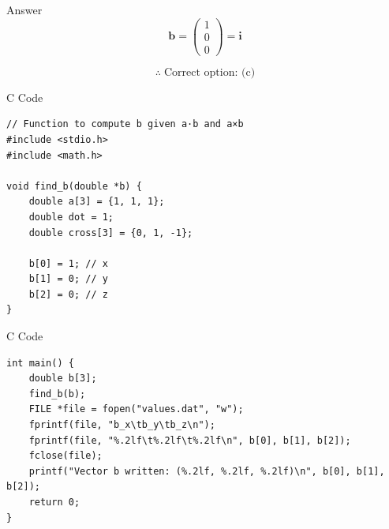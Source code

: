 \documentclass{beamer}
\newcommand{\myvec}[1]{\begin{pmatrix}#1\end{pmatrix}}
\renewcommand{\vec}[1]{\mathbf{#1}}
\begin{document}
\begin{frame}{Answer}
\[
\vec{b} = \myvec{1\\0\\0} = \vec{i}
\]

\[
\therefore \; \text{Correct option: (c)}
\]
\end{frame}

\begin{frame}[fragile]{C Code}
\lstset{language=C}
\begin{lstlisting}
// Function to compute b given a·b and a×b
#include <stdio.h>
#include <math.h>

void find_b(double *b) {
    double a[3] = {1, 1, 1};
    double dot = 1;
    double cross[3] = {0, 1, -1};

    b[0] = 1; // x
    b[1] = 0; // y
    b[2] = 0; // z
}
\end{lstlisting}
\end{frame}

\begin{frame}[fragile]{C Code}
\lstset{language=C}
\begin{lstlisting}
int main() {
    double b[3];
    find_b(b);
    FILE *file = fopen("values.dat", "w");
    fprintf(file, "b_x\tb_y\tb_z\n");
    fprintf(file, "%.2lf\t%.2lf\t%.2lf\n", b[0], b[1], b[2]);
    fclose(file);
    printf("Vector b written: (%.2lf, %.2lf, %.2lf)\n", b[0], b[1], b[2]);
    return 0;
}
\end{lstlisting}
\end{frame}
\end{document}
